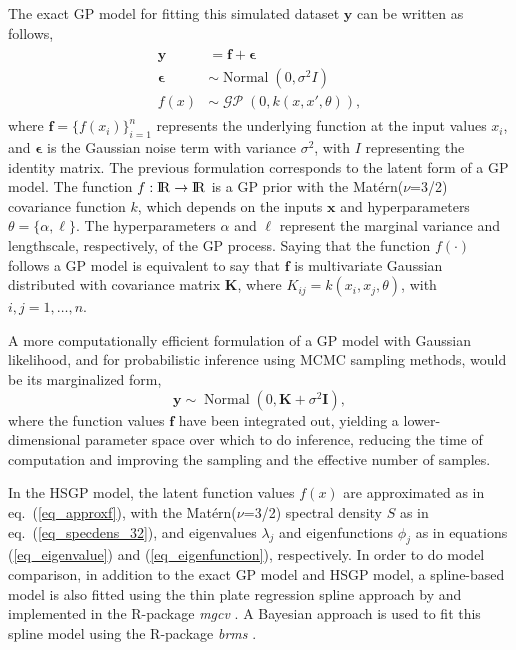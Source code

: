 \documentclass[onecolumn,a4paper,11pt]{article}
\DeclareMathOperator{\GP}{\mathcal{GP}}
\DeclareMathOperator{\Normal}{Normal}
\begin{document}
The exact GP model for fitting this simulated dataset $\bm{y}$ can be written as follows,
%
\begin{align*}\label{ch5_eq_latentgp_simudata1}
\begin{split}
\bm{y} &= \bm{f} + \bm{\epsilon} \\
\bm{\epsilon} &\sim \Normal(0, \sigma^2  I) \\
f(x) &\sim \GP(0, k(x, x', \theta)),
\end{split}
\end{align*}
%
where $\bm{f}=\{f(x_i)\}_{i=1}^n$ represents the underlying function at the input values $x_i$, and $\bm{\epsilon}$ is the Gaussian noise term with variance $\sigma^2$, with $I$ representing the identity matrix. The previous formulation corresponds to the latent form of a GP model. The function $f:{\rm I\!R} \to {\rm I\!R}$ is a GP prior with the Mat{\'e}rn($\nu$=3/2) covariance function $k$, which depends on the inputs $\bm{x}$ and hyperparameters $\theta=\{\alpha,\ell\}$. The hyperparameters $\alpha$ and $\ell$ represent the marginal variance and lengthscale, respectively, of the GP process. Saying that the function $f(\cdot)$ follows a GP model is equivalent to say that $\bm{f}$ is multivariate Gaussian distributed with covariance matrix $\bm{K}$, where $K_{ij}=k(x_i,x_j,\theta)$, with $i,j=1,\dots,n$.
 
A more computationally efficient formulation of a GP model with Gaussian likelihood, and for probabilistic inference using MCMC sampling methods, would be its marginalized form,
%
\begin{equation*}\label{ch5_eq_marginalizedgp_simudata1}
\bm{y} \sim \Normal(0,\bm{K}+ \sigma^2 \bm{I} ),
\end{equation*}
%
where the function values $\bm{f}$ have been integrated out, yielding a lower-dimensional parameter space over which to do inference, reducing the time of computation and improving the sampling and the effective number of samples.

In the HSGP model, the latent function values $f(x)$ are approximated as in eq.~(\ref{eq_approxf}), with the Mat{\'e}rn($\nu$=3/2) spectral density $S$ as in eq.~(\ref{eq_specdens_32}), and eigenvalues $\lambda_j$ and eigenfunctions $\phi_j$ as in equations (\ref{eq_eigenvalue}) and (\ref{eq_eigenfunction}), respectively.  In order to do model comparison, in addition to the exact GP model and HSGP model, a spline-based model is also fitted using the thin plate regression spline approach by \citet{wood2003thin} and implemented in the R-package \textit{mgcv} \citep{wood2011mgcv}. A Bayesian approach is used to fit this spline model using the R-package \textit{brms} \citep{burkner2017brms}.
\end{document}
